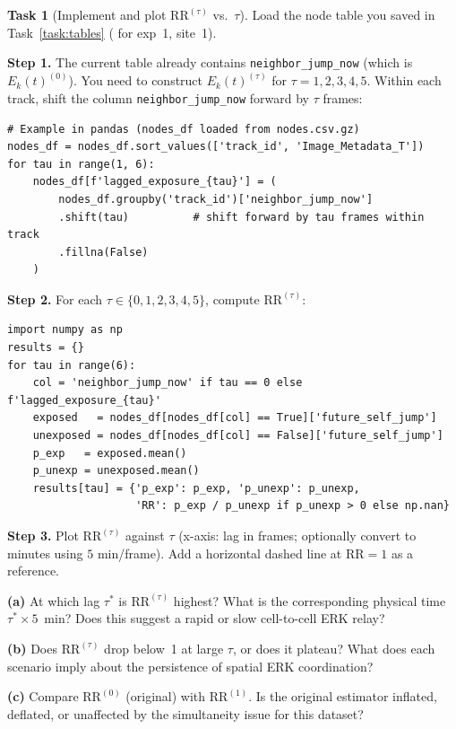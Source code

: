 \documentclass[11pt,a4paper]{article}
\theoremstyle{definition}
\newtheorem{task}{Task}
\newcommand{\expo}[2]{E_{#1}(#2)}
\newcommand{\RR}{\mathrm{RR}}
\newcommand{\1}[1]{\mathbf{1}\!\left[#1\right]}
\newcommand{\param}[1]{\texttt{#1}}
\newcommand{\file}[1]{\path{#1}}
\begin{document}
\begin{task}[Implement and plot $\RR^{(\tau)}$ vs.\ $\tau$]\label{task:lag}
Load the node table you saved in Task~\ref{task:tables}
(\file{nodes.csv.gz} for exp~1, site~1).

\medskip
\noindent\textbf{Step 1.}
The current table already contains \param{neighbor\_jump\_now} (which is
$\expo{k}{t}^{(0)}$).
You need to construct $\expo{k}{t}^{(\tau)}$ for $\tau = 1, 2, 3, 4, 5$.
Within each track, shift the column \param{neighbor\_jump\_now} forward
by $\tau$ frames:
\begin{framed}
\begin{verbatim}
# Example in pandas (nodes_df loaded from nodes.csv.gz)
nodes_df = nodes_df.sort_values(['track_id', 'Image_Metadata_T'])
for tau in range(1, 6):
    nodes_df[f'lagged_exposure_{tau}'] = (
        nodes_df.groupby('track_id')['neighbor_jump_now']
        .shift(tau)          # shift forward by tau frames within track
        .fillna(False)
    )
\end{verbatim}
\end{framed}

\noindent\textbf{Step 2.}
For each $\tau \in \{0, 1, 2, 3, 4, 5\}$, compute $\RR^{(\tau)}$:

\begin{framed}
\begin{verbatim}
import numpy as np
results = {}
for tau in range(6):
    col = 'neighbor_jump_now' if tau == 0 else f'lagged_exposure_{tau}'
    exposed   = nodes_df[nodes_df[col] == True]['future_self_jump']
    unexposed = nodes_df[nodes_df[col] == False]['future_self_jump']
    p_exp   = exposed.mean()
    p_unexp = unexposed.mean()
    results[tau] = {'p_exp': p_exp, 'p_unexp': p_unexp,
                    'RR': p_exp / p_unexp if p_unexp > 0 else np.nan}
\end{verbatim}
\end{framed}

\noindent\textbf{Step 3.}
Plot $\RR^{(\tau)}$ against $\tau$ (x-axis: lag in frames; optionally
convert to minutes using $5$ min/frame).
Add a horizontal dashed line at $\RR = 1$ as a reference.

\medskip
\noindent\textbf{(a)} At which lag $\tau^*$ is $\RR^{(\tau)}$ highest?
What is the corresponding physical time $\tau^* \times 5$~min?
Does this suggest a rapid or slow cell-to-cell ERK relay?



\noindent\textbf{(b)} Does $\RR^{(\tau)}$ drop below~1 at large $\tau$,
or does it plateau?
What does each scenario imply about the persistence of spatial ERK
coordination?



\noindent\textbf{(c)} Compare $\RR^{(0)}$ (original) with $\RR^{(1)}$.
Is the original estimator inflated, deflated, or unaffected by the
simultaneity issue for this dataset?


\end{task}
\end{document}
